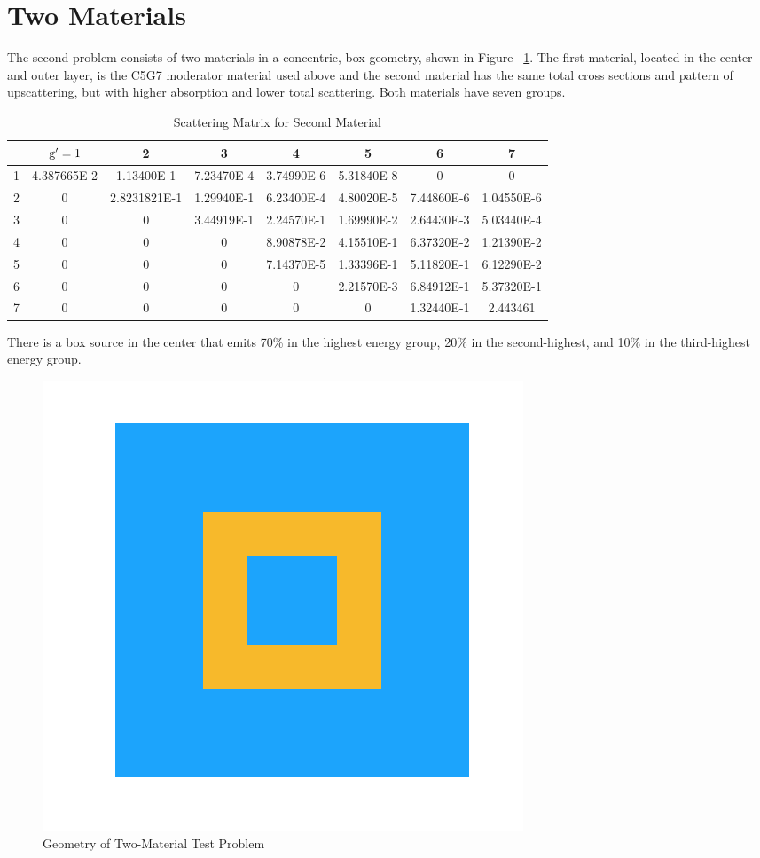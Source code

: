 \section{Two Materials}
The second problem consists of two materials in a concentric, box geometry, shown in Figure ~\ref{fig:test_geometry}. 
The first material, located in the center and outer layer, is the C5G7 moderator material used above and the second material has the same total cross sections and pattern of upscattering, but with higher absorption and lower total scattering. Both materials have seven groups. 

 \begin{table}[!htb]
\small
\centering
\caption{Scattering Matrix for Second Material}
    \label{tab:two}
\begin{center}
    \begin{tabular}{|c|c|c|c|c|c|c|c|}
\hline
 & $\mathrm{g}'=1$ & 2 & 3 & 4 & 5 & 6 & 7 \\ 
\hline
1 & 4.387665E-2 & 1.13400E-1   &  7.23470E-4 & 3.74990E-6 & 5.31840E-8  &     0    &     0    \\
\hline
2 & 0        &    2.8231821E-1  & 1.29940E-1 & 6.23400E-4 & 4.80020E-5 & 7.44860E-6 & 1.04550E-6 \\
\hline
3 & 0       &        0    &       3.44919E-1 & 2.24570E-1 & 1.69990E-2 & 2.64430E-3 & 5.03440E-4 \\
\hline
4 & 0         &      0      &         0     &  8.90878E-2 & 4.15510E-1 & 6.37320E-2 & 1.21390E-2 \\
\hline
5 & 0     &          0       &        0   &    7.14370E-5 & 1.33396E-1 & 5.11820E-1 & 6.12290E-2 \\
\hline
6 & 0   &        0      &         0   &        0     &  2.21570E-3 & 6.84912E-1 & 5.37320E-1 \\
\hline
7 & 0      &         0        &       0    &       0    &       0    &   1.32440E-1 & 2.443461  \\
\hline
    \end{tabular}
\end{center}
\end{table}

There is a box source in the center that emits 70\% in the highest energy group, 20\% in the second-highest, and 10\% in the third-highest energy group.
\begin{figure}[H]
    \centering
    \includegraphics[width=.3\textwidth]{fig/Geometry.png}
    \caption{Geometry of Two-Material Test Problem}
    \label{fig:test_geometry}
\end{figure}

